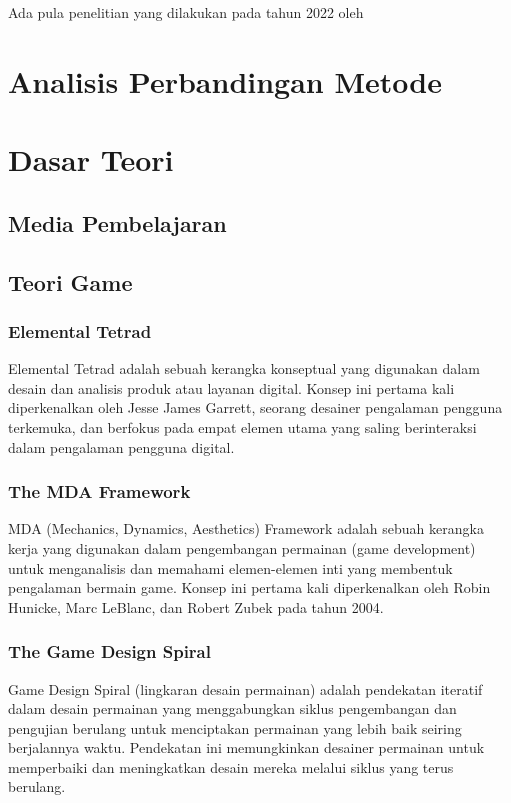   Ada pula penelitian yang dilakukan pada tahun 2022 oleh 
\section{Analisis Perbandingan Metode}
\section{Dasar Teori}
\subsection{Media Pembelajaran}
\subsection{Teori Game}
\subsubsection{Elemental Tetrad} 
Elemental Tetrad adalah sebuah kerangka konseptual yang digunakan dalam desain dan analisis produk atau layanan digital. 
Konsep ini pertama kali diperkenalkan oleh Jesse James Garrett, seorang desainer pengalaman pengguna terkemuka, 
dan berfokus pada empat elemen utama yang saling berinteraksi dalam pengalaman pengguna digital.

\subsubsection{The MDA Framework}
MDA (Mechanics, Dynamics, Aesthetics) Framework adalah sebuah kerangka kerja yang digunakan dalam pengembangan permainan
(game development) untuk menganalisis dan memahami elemen-elemen inti yang membentuk pengalaman bermain game. 
Konsep ini pertama kali diperkenalkan oleh Robin Hunicke, Marc LeBlanc, dan Robert Zubek pada tahun 2004.
\subsubsection{The Game Design Spiral}
Game Design Spiral (lingkaran desain permainan) adalah pendekatan iteratif 
dalam desain permainan yang menggabungkan siklus pengembangan dan pengujian berulang untuk menciptakan 
permainan yang lebih baik seiring berjalannya waktu. Pendekatan ini memungkinkan desainer permainan untuk 
memperbaiki dan meningkatkan desain mereka melalui siklus yang terus berulang.
